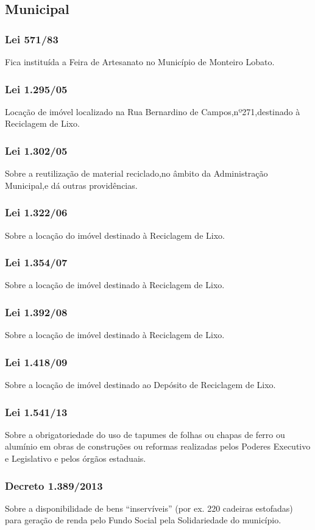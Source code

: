 \begin{subapend}
	\subsection{Municipal}
	\begin{subsubapend}
		\subsubsection{Lei 571/83}
		Fica instituída a Feira de Artesanato no Município de Monteiro Lobato.
		\subsubsection{Lei 1.295/05}
		Locação de imóvel localizado na Rua Bernardino de Campos,nº271,destinado à Reciclagem de Lixo.
		\subsubsection{Lei 1.302/05}
		Sobre a reutilização de material reciclado,no âmbito da Administração Municipal,e dá outras providências.
		\subsubsection{Lei 1.322/06}
		Sobre a locação do imóvel destinado à Reciclagem de Lixo.
		\subsubsection{Lei 1.354/07}
		Sobre a locação de imóvel destinado à Reciclagem de Lixo.
		\subsubsection{Lei 1.392/08}
		Sobre a locação de imóvel destinado à Reciclagem de Lixo.
		\subsubsection{Lei 1.418/09}
		Sobre a locação de imóvel destinado ao Depósito de Reciclagem de Lixo.
		\subsubsection{Lei 1.541/13}
		Sobre a obrigatoriedade do uso de tapumes de folhas ou chapas de ferro ou alumínio em obras de construções ou reformas realizadas pelos Poderes Executivo e Legislativo e pelos órgãos estaduais.
		\subsubsection{Decreto 1.389/2013}
		Sobre a disponibilidade de bens “inservíveis” (por ex. 220 cadeiras estofadas) para geração de renda pelo Fundo Social pela Solidariedade do município.
	\end{subsubapend}
\end{subapend}



